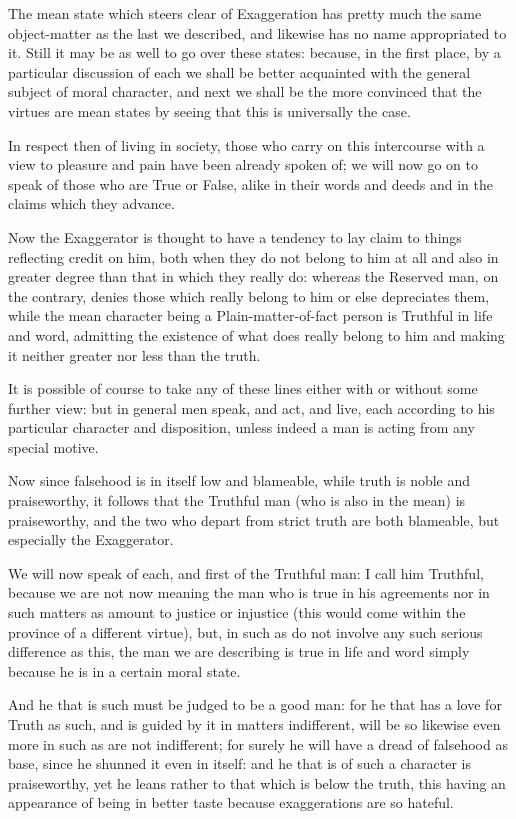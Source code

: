 
The mean state which steers clear of Exaggeration has pretty much the same
object-matter as the last we described, and likewise has no name appropriated
to it. Still it may be as well to go over these states: because, in the first
place, by a particular discussion of each we shall be better acquainted with
the general subject of moral character, and next we shall be the more convinced
that the virtues are mean states by seeing that this is universally the case.

In respect then of living in society, those who carry on this intercourse with
a view to pleasure and pain have been already spoken of; we will now go on to
speak of those who are True or False, alike in their words and deeds and in the
claims which they advance.

Now the Exaggerator is thought to have a tendency to lay claim to things
reflecting credit on him, both when they do not belong to him at all and also
in greater degree than that in which they really do: whereas the Reserved man,
on the contrary, denies those which really belong to him or else depreciates
them, while the mean character being a Plain-matter-of-fact person is Truthful
in life and word, admitting the existence of what does really belong to him and
making it neither greater nor less than the truth.

It is possible of course to take any of these lines either with or without some
further view: but in general men speak, and act, and live, each according to
his particular character and disposition, unless indeed a man is acting from
any special motive.

Now since falsehood is in itself low and blameable, while truth is noble and
praiseworthy, it follows that the Truthful man (who is also in the mean) is
praiseworthy, and the two who depart from strict truth are both blameable, but
especially the Exaggerator.

We will now speak of each, and first of the Truthful man: I call him Truthful,
because we are not now meaning the man who is true in his agreements nor in
such matters as amount to justice or injustice (this would come within the
province of a different virtue), but, in such as do not involve any such
serious difference as this, the man we are describing is true in life and word
simply because he is in a certain moral state.

And he that is such must be judged to be a good man: for he that has a love for
Truth as such, and is guided by it in matters indifferent, will be so likewise
even more in such as are not indifferent; for surely he will have a dread of
falsehood as base, since he shunned it even in itself: and he that is of such a
character is praiseworthy, yet he leans rather to that which is below the
truth, this having an appearance of being in better taste because exaggerations
are so hateful.

